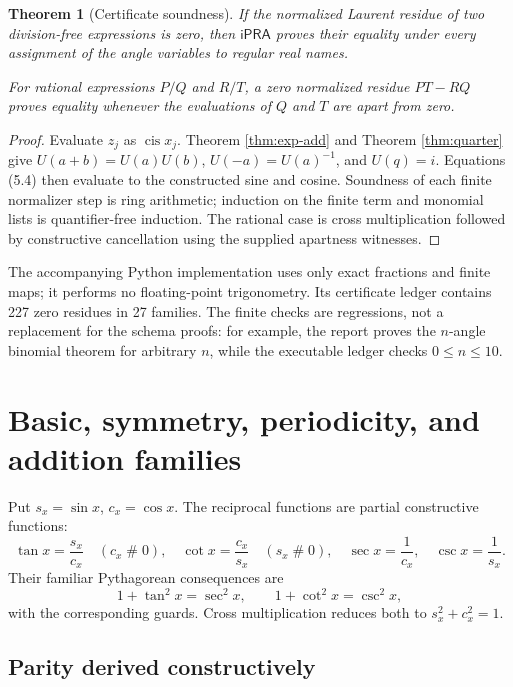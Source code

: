 \documentclass[11pt]{article}
\newtheorem{theorem}{Theorem}[section]
\theoremstyle{definition}
\newcommand{\iPRA}{\mathsf{iPRA}}
\newcommand{\cis}{\operatorname{cis}}
\newcommand{\apart}{\mathrel{\#}}
\begin{document}
\begin{theorem}[Certificate soundness]
\label{thm:certificate-sound}
If the normalized Laurent residue of two division-free expressions is zero,
then \(\iPRA\) proves their equality under every assignment of the angle
variables to regular real names.

For rational expressions \(P/Q\) and \(R/T\), a zero normalized residue
\(PT-RQ\) proves equality whenever the evaluations of \(Q\) and \(T\) are
apart from zero.
\end{theorem}

\begin{proof}
Evaluate \(z_j\) as \(\cis x_j\).  Theorem \ref{thm:exp-add} and Theorem
\ref{thm:quarter} give
\(U(a+b)=U(a)U(b)\), \(U(-a)=U(a)^{-1}\), and \(U(q)=i\).  Equations (5.4)
then evaluate to the constructed sine and cosine.  Soundness of each finite
normalizer step is ring arithmetic; induction on the finite term and monomial
lists is quantifier-free induction.  The rational case is cross multiplication
followed by constructive cancellation using the supplied apartness witnesses.
\end{proof}

The accompanying Python implementation uses only exact fractions and finite
maps; it performs no floating-point trigonometry.  Its certificate ledger
contains 227 zero residues in 27 families.  The finite checks are regressions,
not a replacement for the schema proofs: for example, the report proves the
\(n\)-angle binomial theorem for arbitrary \(n\), while the executable ledger
checks \(0\le n\le10\).

\section{Basic, symmetry, periodicity, and addition families}
\label{sec:algebra-families}

Put \(s_x=\sin x\), \(c_x=\cos x\).  The reciprocal functions are partial
constructive functions:
\[
 \tan x=\frac{s_x}{c_x}\quad(c_x\apart0),\quad
 \cot x=\frac{c_x}{s_x}\quad(s_x\apart0),\quad
 \sec x=\frac1{c_x},\quad \csc x=\frac1{s_x}.
 \tag{6.1}
\]
Their familiar Pythagorean consequences are
\[
 1+\tan^2x=\sec^2x,
 \qquad 1+\cot^2x=\csc^2x,
 \tag{6.2}
\]
with the corresponding guards.  Cross multiplication reduces both to
\(s_x^2+c_x^2=1\).

\subsection{Parity derived constructively}
\end{document}
